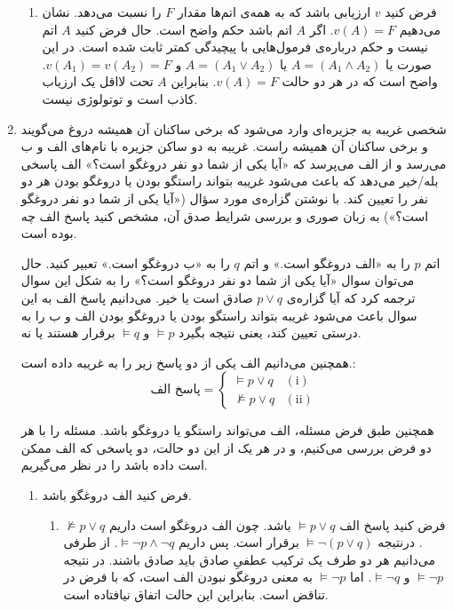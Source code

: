 \documentclass[12pt, 14paper]{article}
\begin{document}
\begin{enumerate}
\begin{ans}
\begin{enumerate}
  \item
  فرض کنید $v$ ارزیابی باشد که به همه‌ی اتم‌ها مقدار $F$ را نسبت می‌دهد. نشان می‌دهیم $v(A)=F$. اگر $A$ اتم باشد حکم واضح است. حال فرض کنید $A$ اتم نیست و حکم درباره‌ی فرمول‌هایی با پیچیدگی کمتر ثابت شده است. در این صورت یا $A=(A_1\wedge A_2)$ یا $A=(A_1\vee A_2)$ و $v(A_1)=v(A_2)=F$. واضح است که در هر دو حالت $v(A)=F$. بنابراین $A$ تحت لااقل یک ارزیاب کاذب است و توتولوژی نیست.
  
  \end{enumerate}
\end{ans}

\item
شخصی غریبه به جزیره‌ای وارد می‌شود که برخی ساکنان آن همیشه دروغ می‌گویند و برخی ساکنان آن همیشه راست. غریبه به دو ساکن جزیره با نام‌های الف و ب می‌رسد و از الف می‌پرسد که «آیا یکی از شما دو نفر دروغگو است؟» الف پاسخی بله/خیر می‌دهد که باعث می‌شود غریبه بتواند راستگو بودن یا دروغگو بودن هر دو نفر را تعیین کند. با نوشتن گزاره‌ی مورد سؤال («آیا یکی از شما دو نفر دروغگو است؟») به زبان صوری و بررسی شرایط صدق آن، مشخص کنید پاسخ الف چه بوده است.
\begin{ans}
  اتم‌
  $p$
  را به «الف دروغگو است.» و اتم
  $q$
  را به «ب دروغگو است.» تعبیر کنید. حال می‌توان سوال «آیا یکی از شما دو نفر دروغگو است؟» را به شکل این سوال ترجمه کرد که آیا گزاره‌ی $p \vee q$ صادق است یا خیر. می‌دانیم پاسخ الف به این سوال باعث می‌شود غریبه بتواند راستگو بودن یا دروغگو بودن الف و ب را به درستی تعیین کند، یعنی نتیجه بگیرد
  $\vDash p$
  و
  $\vDash q$
  برقرار هستند یا نه.
  
  همچنین می‌دانیم الف یکی از دو پاسخ زیر را به غریبه داده است.:
  \[ \text{پاسخ الف} =
    \begin{cases}
      \vDash p \vee q & (\text{i}) \\
      \not \vDash p \vee q & (\text{ii})
    \end{cases}
  \]

همچنین طبق فرض مسئله، الف می‌تواند راستگو یا دروغگو باشد. مسئله را با هر دو فرض بررسی می‌کنیم، و در هر یک از این دو حالت، دو پاسخی که الف ممکن است داده باشد را در نظر می‌گیریم.
  \begin{enumerate}
    \item فرض کنید الف دروغگو باشد.
    \begin{enumerate}
      \item فرض کنید پاسخ الف $\vDash p \vee q$
      باشد. چون الف دروغگو است داریم
      $\not \vDash p \vee q$.
      درنتیجه
      $\vDash \neg (p \vee q)$
      برقرار است. پس داریم
      $\vDash \neg p \wedge \neg q$.
      از طرفی می‌دانیم هر دو طرف یک ترکیب عطفیِ صادق باید صادق باشند. در نتیجه
      $\vDash \neg p$
      و
      $\vDash \neg q$.
      اما
      $\vDash \neg p$
      به معنی دروغگو نبودن الف است، که با فرض در تناقض است. بنابراین این حالت اتفاق نیافتاده است.
      

\end{enumerate}
\end{enumerate}
\end{ans}
\end{enumerate}
\end{document}
